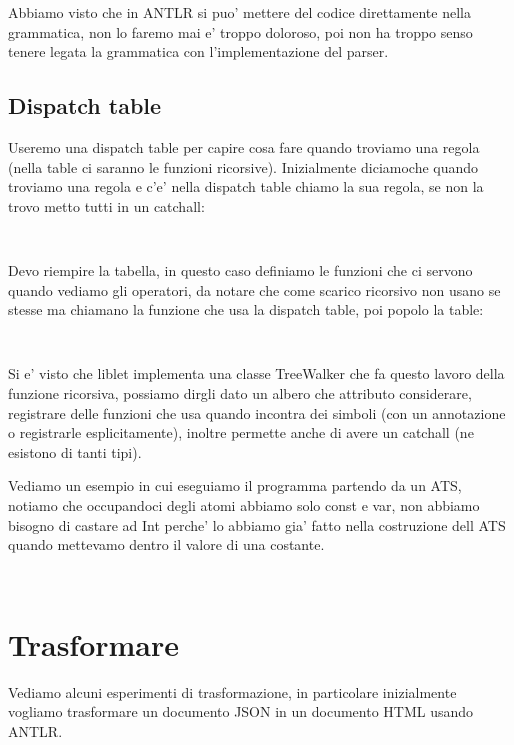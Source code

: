 Abbiamo visto che in ANTLR si puo' mettere del codice direttamente nella grammatica, non lo faremo mai e' troppo doloroso, poi non ha troppo senso tenere legata la grammatica con l'implementazione del parser.

\subsection{Dispatch table}
Useremo una dispatch table per capire cosa fare quando troviamo una regola (nella table ci saranno le funzioni ricorsive). Inizialmente diciamoche quando troviamo una regola e c'e' nella dispatch table chiamo la sua regola, se non la trovo metto tutti in un catchall:
\begin{lstlisting}
    
\end{lstlisting}

Devo riempire la tabella, in questo caso definiamo le funzioni che ci servono quando vediamo gli operatori, da notare che come scarico ricorsivo non usano se stesse ma chiamano la funzione che usa la dispatch table, poi popolo la table:
\begin{lstlisting}
    
\end{lstlisting}

Si e' visto che liblet implementa una classe TreeWalker che fa questo lavoro della funzione ricorsiva, possiamo dirgli dato un albero che attributo considerare, registrare delle funzioni che usa quando incontra dei simboli (con un annotazione o registrarle esplicitamente), inoltre permette anche di avere un catchall (ne esistono di tanti tipi).

Vediamo un esempio in cui eseguiamo il programma partendo da un ATS, notiamo che occupandoci degli atomi abbiamo solo const e var, non abbiamo bisogno di castare ad Int perche' lo abbiamo gia' fatto nella costruzione dell ATS quando mettevamo dentro il valore di una costante.

\begin{lstlisting}
    
\end{lstlisting}

\section{Trasformare}
Vediamo alcuni esperimenti di trasformazione, in particolare inizialmente vogliamo trasformare un documento JSON in un documento HTML usando ANTLR.

